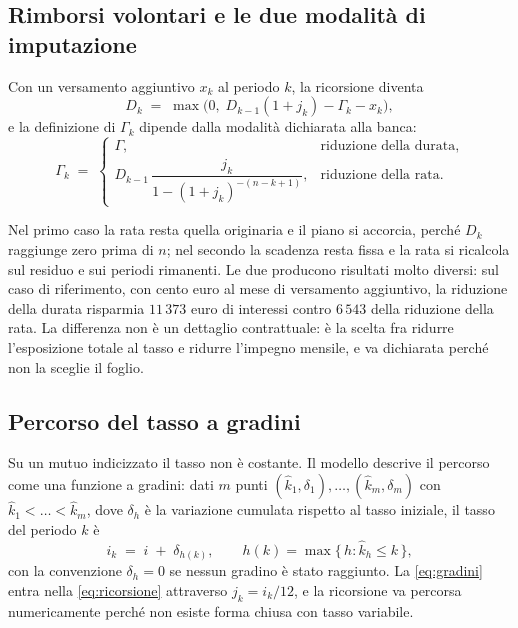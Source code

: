 \documentclass[11pt,a4paper]{article}
\theoremstyle{definition}
\theoremstyle{plain}
\begin{document}
\subsection{Rimborsi volontari e le due modalità di imputazione}

Con un versamento aggiuntivo $x_k$ al periodo $k$, la ricorsione diventa
\begin{equation}
D_k \;=\; \max\big(0,\; D_{k-1}(1+j_k) - \Gamma_k - x_k\big),
\label{eq:ricorsione}
\end{equation}
e la definizione di $\Gamma_k$ dipende dalla modalità dichiarata alla banca:
\begin{equation}
\Gamma_k \;=\;
\begin{cases}
\Gamma, & \text{riduzione della durata,}\\[0.4em]
D_{k-1}\,\dfrac{j_k}{1-(1+j_k)^{-(n-k+1)}}, & \text{riduzione della rata.}
\end{cases}
\label{eq:modalita}
\end{equation}

Nel primo caso la rata resta quella originaria e il piano si accorcia, perché $D_k$ raggiunge zero prima di $n$; nel secondo la scadenza resta fissa e la rata si ricalcola sul residuo e sui periodi rimanenti. Le due producono risultati molto diversi: sul caso di riferimento, con cento euro al mese di versamento aggiuntivo, la riduzione della durata risparmia $11\,373$ euro di interessi contro $6\,543$ della riduzione della rata. La differenza non è un dettaglio contrattuale: è la scelta fra ridurre l'esposizione totale al tasso e ridurre l'impegno mensile, e va dichiarata perché non la sceglie il foglio.

\subsection{Percorso del tasso a gradini}

Su un mutuo indicizzato il tasso non è costante. Il modello descrive il percorso come una funzione a gradini: dati $m$ punti $(\hat{k}_1,\delta_1),\dots,(\hat{k}_m,\delta_m)$ con $\hat{k}_1<\dots<\hat{k}_m$, dove $\delta_h$ è la variazione cumulata rispetto al tasso iniziale, il tasso del periodo $k$ è
\begin{equation}
i_k \;=\; i \;+\; \delta_{h(k)},
\qquad
h(k) = \max\{\,h : \hat{k}_h \le k\,\},
\label{eq:gradini}
\end{equation}
con la convenzione $\delta_{h}=0$ se nessun gradino è stato raggiunto. La \eqref{eq:gradini} entra nella \eqref{eq:ricorsione} attraverso $j_k = i_k/12$, e la ricorsione va percorsa numericamente perché non esiste forma chiusa con tasso variabile.
\end{document}

